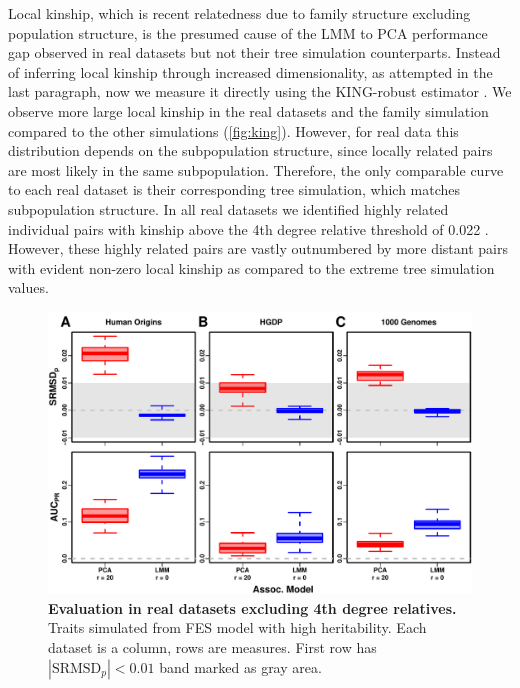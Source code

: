 \documentclass[11pt]{article}
\newcommand{\rmsd}{\text{SRMSD}_p}
\begin{document}
\begin{linenumbers}
Local kinship, which is recent relatedness due to family structure excluding population structure, is the presumed cause of the LMM to PCA performance gap observed in real datasets but not their tree simulation counterparts.
Instead of inferring local kinship through increased dimensionality, as attempted in the last paragraph, now we measure it directly using the KING-robust estimator \citep{manichaikul_robust_2010}.
We observe more large local kinship in the real datasets and the family simulation compared to the other simulations (\cref{fig:king}).
However, for real data this distribution depends on the subpopulation structure, since locally related pairs are most likely in the same subpopulation.
Therefore, the only comparable curve to each real dataset is their corresponding tree simulation, which matches subpopulation structure.
In all real datasets we identified highly related individual pairs with kinship above the 4th degree relative threshold of 0.022 \citep{manichaikul_robust_2010, conomos_model-free_2016}.
However, these highly related pairs are vastly outnumbered by more distant pairs with evident non-zero local kinship as compared to the extreme tree simulation values.

\begin{figure}[hp]
  \centering
  \includegraphics[width=\textwidth]{fes/rmsd-auc_king-cutoff-4.pdf}
  \caption{
    {\bf Evaluation in real datasets excluding 4th degree relatives.}
    Traits simulated from FES model with high heritability.
    Each dataset is a column, rows are measures.
    First row has $|\rmsd| < 0.01$ band marked as gray area.
  }
  \label{fig:king_cutoff}
\end{figure}


\end{linenumbers}
\end{document}
